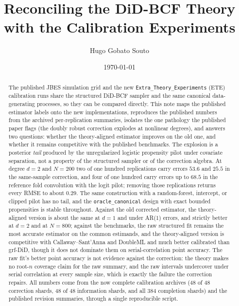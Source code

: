 \documentclass[11pt]{article}
\title{Reconciling the DiD-BCF Theory with the Calibration Experiments}
\author{Hugo Gobato Souto}
\date{\today}
\begin{document}
\maketitle

\begin{abstract}
\noindent The published JBES simulation grid and the new \texttt{Extra\_Theory\_Experiments}
(ETE) calibration runs share the structured DiD-BCF sampler and the same canonical
data-generating processes, so they can be compared directly. This note maps the
published estimator labels onto the new implementations, reproduces the published
numbers from the archived per-replication summaries, isolates the one pathology the
published paper flags (the doubly robust correction explodes at nonlinear degrees), and
answers two questions: whether the theory-aligned estimator improves on the old one, and
whether it remains competitive with the published benchmarks. The explosion is a
posterior \emph{tail} produced by the unregularized logistic propensity pilot under
covariate separation, not a property of the structured sampler or of the correction
algebra. At degree $d=2$ and $N=200$ two of one hundred replications carry errors $53.6$
and $25.5$ in the same-sample correction, and four of one hundred carry errors up to
$68.5$ in the reference fold convolution with the logit pilot; removing those
replications returns every RMSE to about $0.29$. The same construction with a
random-forest, intercept, or clipped pilot has no tail, and the \texttt{oracle\_canonical}
design with exact bounded propensities is stable throughout. Against the old corrected
estimator, the theory-aligned version is about the same at $d=1$ and under AR(1) errors,
and strictly better at $d=2$ and at $N=800$; against the benchmarks, the raw structured
fit remains the most accurate estimator on the common estimands, and the theory-aligned
version is competitive with Callaway--Sant'Anna and DoubleML and much better calibrated
than grf-DiD, though it does not dominate them on serial-correlation point accuracy.
The raw fit's better point accuracy is not evidence against the correction: the theory
makes no root-$n$ coverage claim for the raw summary, and the raw intervals undercover
under serial correlation at every sample size, which is exactly the failure the
correction repairs.
All numbers come from the now complete calibration archives (48 of 48 correction shards,
48 of 48 information shards, and all 384 completion shards) and the published revision summaries, through a single
reproducible script.
\end{abstract}
\end{document}
